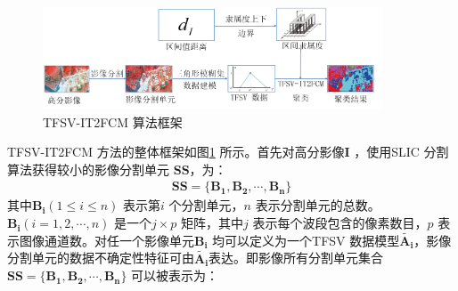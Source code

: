 \begin{figure}[!h]
    \centering
    \includegraphics[width=0.9\textwidth]{figures/tfsvit2fcm}
    \caption{TFSV-IT2FCM 算法框架}
    \label{fig:tfsvit2fcm}
\end{figure}

TFSV-IT2FCM 方法的整体框架如图\ref{fig:tfsvit2fcm} 所示。首先对高分影像$\bm{I}$ ，使用SLIC 分割算法获得较小的影像分割单元 $\bm{SS}$，为：
\begin{equation}\label{eq:image_ss}
    \begin{split}
        \bm{SS} = \lbrace \bm{B_1}, \bm{B_2},\bm{\cdots}, \bm{B_n} \rbrace
    \end{split}
\end{equation}
其中$\bm{B_i}(1 \leq i \leq n)$ 表示第$i$ 个分割单元，$n$ 表示分割单元的总数。 $\bm{B_i}(i=1,2,\cdots, n)$ 是一个$j \times p$ 矩阵，其中$j$ 表示每个波段包含的像素数目，$p$ 表示图像通道数。对任一个影像单元$\bm{B_i}$ 均可以定义为一个TFSV 数据模型$\bm{\tilde{A_i}}$，影像分割单元的数据不确定性特征可由$\bm{\tilde{A_i}}$表达。即影像所有分割单元集合$\bm{SS} = \lbrace \bm{B_1}, \bm{B_2},\bm{\cdots}, \bm{B_n} \rbrace$ 可以被表示为：

